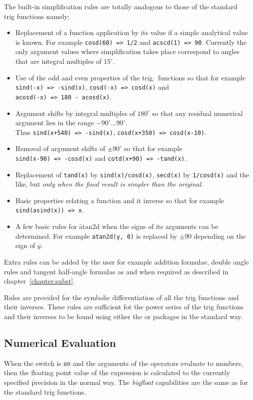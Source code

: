 The built-in simplification rules are totally analogous to those of the standard trig functions namely:
\begin{itemize}
\item  Replacement of a function application by its value if a simple analytical value is known. For example \texttt{cosd(60) => 1/2} and \texttt{acscd(1) => 90}. Currently the only argument values where simplification takes place correspond  to angles that are integral multiples of $15^\circ$.
\item Use of the odd and even properties of the trig.\ functions so that for example 
\texttt{sind(-x) => -sind(x)}, \texttt{cosd(-x) => cosd(x)}  and \\
\texttt{acosd(-x) => 180 - acosd(x)}. 
\item  Argument shifts by integral multiples of $180^\circ$ so that any residual numerical argument  lies in the range $-90^\circ \ldots  90^\circ$.  \\
Thus \texttt{sind(x+540) => -sind(x)}, \texttt{cosd(x+350) => cosd(x-10)}.
\item  Removal of argument shifts of $\pm 90^\circ$ so that for example \\
 \texttt{sind(x-90) => -cosd(x)} and  \texttt{cotd(x+90) => -tand(x)}.
\item Replacement of \texttt{tand(x)} by \texttt{sind(x)/cosd(x)}, \texttt{secd(x)} by \texttt{1/cosd(x)} and the like, but \emph{only when the final result is simpler than the original}.
\item Basic properties relating a function and it inverse so that for example \\
\texttt{sind(asind(x)) => x}.
\item A few basic rules for \f{atan2d} when the signs of its arguments can be determined. For example \texttt{atan2d(y, 0)} is replaced by $\pm 90$ depending on the sign of $y$.
\end{itemize}

Extra rules can be added by the user for example addition formulae, double  angle rules and tangent half-angle formulae as and when required as described in chapter~\ref{chapter:subst}.

Rules are provided for the symbolic differentiation of all the trig  functions and their inverses.  These rules are sufficient fot the power series of the trig functions and their inverses to be found using either the  or  packages in the standard way.


\subsection{Numerical Evaluation}
When the switch  is \texttt{on} and the arguments of the operators evaluate to numbers, then the floating point value of the expression is calculated to the currently specified \f{precision} in the normal way.  The \textit{bigfloat} capabilities are  the same as for the standard trig functions.   

